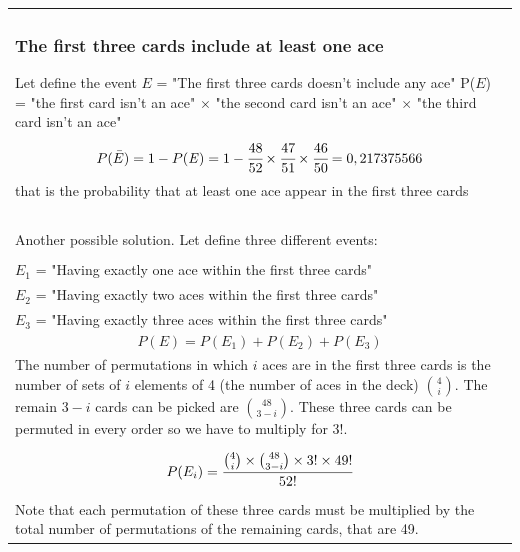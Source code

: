 \documentclass[oneside]{article}			%
\newenvironment{adjustwidth}{\begin{center}\begin{tabular}{p{0.9\textwidth}}   }{\end{tabular} \end{center}}		%
\begin{document}
	\begin{adjustwidth}
	\subsubsection{The first three cards include at least one ace}
	Let define the event $\mathit{E}$ = "The first three cards doesn't include any ace" \newline
	P($\mathit{E}$) = "the first card isn't an ace" $\times$ "the second card isn't an ace" $\times$ "the third card isn't an ace"
	\[ P(\bar{E}) = 1 - P(\mathit{E}) = 1 - \cfrac{48}{52} \times \cfrac{47}{51} \times \cfrac{46}{50}  = 0,217375566  \]
	that is the probability that at least one ace appear in the first three cards
	\\\\\\
	Another possible solution. Let define three different events:
	\\\\
	$E_1$ = "Having exactly one ace within the first three cards"
	\\
	$E_2$ = "Having exactly two aces within the first three cards"
	\\
	$E_3$ = "Having exactly three aces within the first three cards"
	\\
	\[P(E) = P(E_1)+P(E_2)+P(E_3)\]
	\\
	The number of permutations in which $i$ aces are in the first three cards is the number of sets of $i$ elements of 4 (the number of aces in the deck) $\binom{4}{i}$. The remain $3-i$ cards can be picked are $\binom{48}{3-i}$. These three cards can be permuted in every order so we have to multiply for $3!$.
	\\
	\[P(E_i) = \cfrac{\binom{4}{i} \times \binom{48}{3-i} \times 3! \times 49!}{52!}   \]
	\\
	Note that each permutation of these three cards must be multiplied by the total number of permutations of the remaining cards, that are 49.

	\end{adjustwidth}
\end{document}

